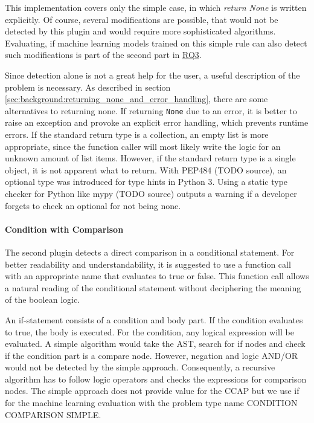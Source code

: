 This implementation covers only the simple case, in which \textit{return None} is written explicitly. Of course, several modifications are possible, that would not be detected by this plugin and would require more sophisticated algorithms. Evaluating, if machine learning models trained on this simple rule can also detect such modifications is part of the second part in \hyperref[rq:3]{RQ3}.

Since detection alone is not a great help for the user, a useful description of the problem is necessary. 
As described in section \ref{sec:background:returning_none_and_error_handling}, there are some alternatives to returning none. If returning \texttt{None} due to an error, it is better to raise an exception and provoke an explicit error handling, which prevents runtime errors. If the standard return type is a collection, an empty list is more appropriate, since the function caller will most likely write the logic for an unknown amount of list items. However, if the standard return type is a single object, it is not apparent what to return. With PEP484 (TODO source), an optional type was introduced for type hints in Python 3. Using a static type checker for Python like mypy (TODO source) outputs a warning if a developer forgets to check an optional for not being none. 

\paragraph{Condition with Comparison}\label{sec:condition_comparison}
The second plugin detects a direct comparison in a conditional statement. For better readability and understandability, it is suggested to use a function call with an appropriate name that evaluates to true or false. This function call allows a natural reading of the conditional statement without deciphering the meaning of the boolean logic.

An if-statement consists of a condition and body part. If the condition evaluates to true, the body is executed. For the condition, any logical expression will be evaluated. A simple algorithm would take the AST, search for if nodes and check if the condition part is a compare node.
However, negation and logic AND/OR would not be detected by the simple approach. Consequently, a recursive algorithm has to follow logic operators and checks the expressions for comparison nodes. The simple approach does not provide value for the CCAP but we use if for the machine learning evaluation with the problem type name CONDITION COMPARISON SIMPLE.

